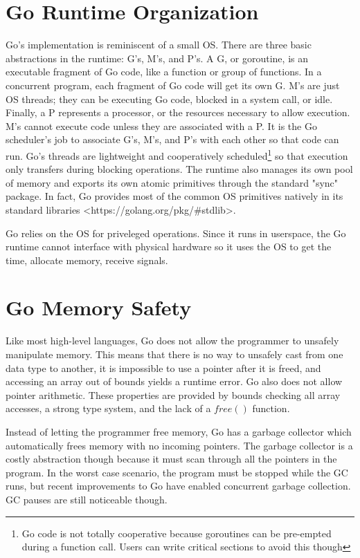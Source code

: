 \section{Go Runtime Organization}
Go's implementation is reminiscent of a small OS. There are three basic
abstractions in the runtime: G's, M's, and P's. A G, or goroutine, is an
executable fragment of Go code, like a function or group of functions. In a concurrent program,
each fragment of Go code will get its
own G. M's are just OS threads; they can be executing Go code, blocked in a system call,
or idle. Finally, a P represents a processor, or the resources necessary to
allow execution. M's cannot execute code unless they are associated with a P.
It is the Go scheduler's job to associate G's, M's, and P's with each other so
that code can run. Go's threads are lightweight and
cooperatively scheduled\footnote{Go code is not totally cooperative because goroutines can be pre-empted during a function call. Users can write critical sections to avoid this though}
so that execution only transfers during
blocking operations. The runtime also manages its own pool of memory
and exports its own atomic primitives through the standard "sync"
package. In fact, Go provides most of the common OS primitives natively
in its standard libraries <https://golang.org/pkg/\#stdlib>.

Go relies on the OS for priveleged operations. Since it runs in userspace,
the Go runtime cannot interface with physical hardware so it uses the OS
to get the time, allocate memory, receive signals.


\section{Go Memory Safety}
Like most high-level languages, Go does not allow the programmer to unsafely
manipulate memory. This means that there is no way to unsafely cast from one data type
to another, it is impossible to use a pointer after it is freed, and accessing
an array out of bounds yields a runtime error. Go also does not allow pointer arithmetic.
These properties are provided by bounds checking all array accesses, a strong type system,
and the lack of a $free()$ function.

Instead of letting the programmer free memory, Go
has a garbage collector which automatically frees memory with no incoming pointers.
The garbage collector is a costly abstraction though because it must scan through all
the pointers in the program. In the worst case scenario, the program must be
stopped while the GC runs, but recent improvements to Go have enabled concurrent garbage collection.
GC pauses are still noticeable though.

